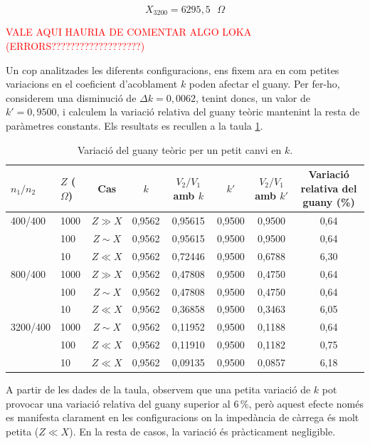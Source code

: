\documentclass[a4paper,10.5pt]{report}
\begin{document}
\begin{equation}
	X_{3200} = 6295,5 \text{ $\Omega$}
\end{equation}

\textcolor{red}{VALE AQUI HAURIA DE COMENTAR ALGO LOKA (ERRORS???????????????????)}

Un cop analitzades les diferents configuracions, ens fixem ara en com petites variacions en el coeficient d’acoblament $k$ poden afectar el guany. Per fer-ho, considerem una disminució de $\Delta k = 0{,}0062$, tenint doncs, un valor de $k' = 0,9500$, i calculem la variació relativa del guany teòric mantenint la resta de paràmetres constants. Els resultats es recullen a la taula \ref{tab:4.6}.


\begin{table}[H]
	\centering
	\renewcommand{\arraystretch}{1.2}
	\caption{Variació del guany teòric per un petit canvi en $k$.}
	\begin{tabular}{llcccccc}
		\toprule
		$n_1/n_2$ & $Z$ ($\Omega$) & Cas & $k$ & $V_2/V_1$ amb $k$ & $k'$ & $V_2/V_1$ amb $k'$ & Variació relativa del guany (\%) \\
		\midrule
		400/400 & 1000 & $Z \gg X$ & 0,9562 & 0,95615 & 0,9500 & 0,9500 & 0,64 \\
		& 100  & $Z \sim X$ & 0,9562 & 0,95615 & 0,9500 & 0,9500 & 0,64 \\
		& 10   & $Z \ll X$ & 0,9562 & 0,72446 & 0,9500 & 0,6788 & 6,30 \\
		\midrule
		800/400 & 1000 & $Z \gg X$ & 0,9562 & 0,47808 & 0,9500 & 0,4750 & 0,64 \\
		& 100  & $Z \sim X$ & 0,9562 & 0,47808 & 0,9500 & 0,4750 & 0,64 \\
		& 10   & $Z \ll X$ & 0,9562 & 0,36858 & 0,9500 & 0,3463 & 6,05 \\
		\midrule
		3200/400 & 1000 & $Z \sim X$ & 0,9562 & 0,11952 & 0,9500 & 0,1188 & 0,64 \\
		& 100  & $Z \ll X$ & 0,9562 & 0,11910 & 0,9500 & 0,1182 & 0,75 \\
		& 10   & $Z \ll X$ & 0,9562 & 0,09135 & 0,9500 & 0,0857 & 6,18 \\
		\bottomrule
	\end{tabular}
	\label{tab:4.6}
\end{table}

A partir de les dades de la taula, observem que una petita variació de $k$  pot provocar una variació relativa del guany superior al $6\,\%$, però aquest efecte només es manifesta clarament en les configuracions on la impedància de càrrega és molt petita ($Z \ll X$). En la resta de casos, la variació és pràcticament negligible.
\end{document}
